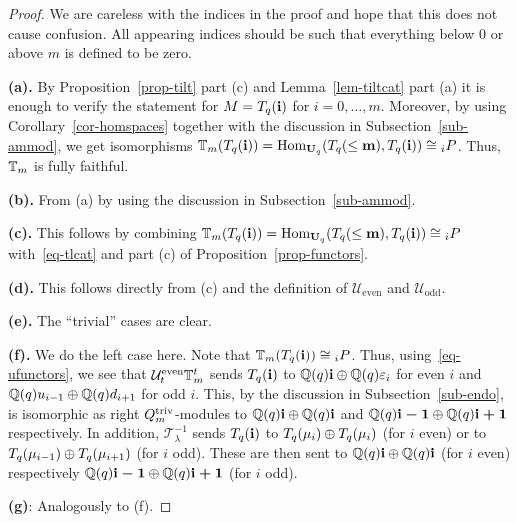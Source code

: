 \begin{proof}
We are careless with the indices in the proof 
and hope that this does not cause confusion. All 
appearing indices should be such that everything 
below $0$ or above $m$ is defined to be zero.



\textbf{(a).} By Proposition~\ref{prop-tilt} part 
(c) and Lemma~\ref{lem-tiltcat} part (a) it is enough 
to verify the statement for $M=T_q({\boldsymbol{\mathrm{i}}})$ for $i=0,\dots,m$. 
Moreover, by using Corollary~\ref{cor-homspaces} together 
with the discussion in Subsection~\ref{sub-ammod}, we 
get isomorphisms $\mathbb{T}_m(T_q({\boldsymbol{\mathrm{i}}}))=\mathrm{Hom}_{\boldsymbol{\mathrm{U}}_q}(T_q({\leq \boldsymbol{\mathrm{m}}}),T_q({\boldsymbol{\mathrm{i}}}))\cong {}_iP$. 
Thus, $\mathbb{T}_m$ is fully faithful.



\textbf{(b).} From (a) by using the discussion in 
Subsection~\ref{sub-ammod}.



\textbf{(c).} This follows by combining 
$\mathbb{T}_m(T_q({\boldsymbol{\mathrm{i}}}))=\mathrm{Hom}_{\boldsymbol{\mathrm{U}}_q}(T_q({\leq \boldsymbol{\mathrm{m}}}),T_q({\boldsymbol{\mathrm{i}}}))\cong {}_iP$ 
with~\eqref{eq-tlcat} and part (c) of Proposition~\ref{prop-functors}.



\textbf{(d).} This follows directly from (c) 
and the definition of $\mathcal U_{\mathrm{even}}$ and $\mathcal U_{\mathrm{odd}}$. 



\textbf{(e).} The ``trivial'' cases are clear.



\textbf{(f).} We do the left case here. Note that $\mathbb{T}_m(T_q({\boldsymbol{\mathrm{i}}}))\cong {}_iP$. 
Thus, using~\eqref{eq-ufunctors}, we see that 
$\mathcal U^{\mathrm{even}}_t\mathbb{T}_m^t$ sends 
$T_q({\boldsymbol{\mathrm{i}}})$ to $\mathbb{Q}(q)\boldsymbol{\mathrm{i}}\oplus\mathbb{Q}(q)\varepsilon_i$ 
for even $i$ and $\mathbb{Q}(q) u_{i-1}\oplus \mathbb{Q}(q) d_{i+1}$ for odd $i$.
This, by the discussion in Subsection~\ref{sub-endo}, 
is isomorphic as right $Q_m^{\mathrm{triv}}$-modules to 
$\mathbb{Q}(q)\boldsymbol{\mathrm{i}}\oplus\mathbb{Q}(q)\boldsymbol{\mathrm{i}}$ and $\mathbb{Q}(q)\boldsymbol{\mathrm{i}-1}\oplus\mathbb{Q}(q)\boldsymbol{\mathrm{i}+1}$ 
respectively. In addition, $\mathcal T^{-1}_{\lambda}$ 
sends $T_q({\boldsymbol{\mathrm{i}}})$ to $T_q({\mu_i})\oplus T_q({\mu_i})$ 
(for $i$ even) or to $T_q({\mu_{i-1}})\oplus T_q({\mu_{i+1}})$ 
(for $i$ odd). These are then sent to $\mathbb{Q}(q)\boldsymbol{\mathrm{i}}\oplus\mathbb{Q}(q)\boldsymbol{\mathrm{i}}$ (for $i$ even) 
respectively $\mathbb{Q}(q)\boldsymbol{\mathrm{i}-1}\oplus\mathbb{Q}(q)\boldsymbol{\mathrm{i}+1}$ (for $i$ odd).



\textbf{(g)}: Analogously to (f).
\end{proof}



